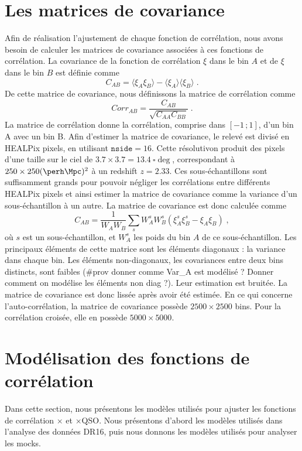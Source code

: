 \documentclass[11pt, twoside, a4paper, openright]{report}
\begin{document}
\section{Les matrices de covariance}
Afin de réalisation l'ajustement de chaque fonction de corrélation, nous avons besoin de calculer les matrices de covariance associées à ces fonctions de corrélation. La covariance de la fonction de corrélation $\xi$ dans le bin $A$ et de $\xi$ dans le bin $B$ est définie comme
\begin{equation}
  C_{AB} = \langle \xi_A \xi_B \rangle - \langle \xi_A \rangle \langle \xi_B \rangle \; .
\end{equation}
De cette matrice de covariance, nous définissons la matrice de corrélation comme
\begin{equation}
  Corr_{AB} = \frac{C_{AB}}{\sqrt{C_{AA} C_{BB}}} \; .
\end{equation}
La matrice de corrélation donne la corrélation, comprise dans $[-1 \, ; 1]$, d'un bin A avec un bin B.
Afin d'estimer la matrice de covariance, le relevé est divisé en HEALPix pixels, en utilisant $\texttt{nside} = \num{16}$. Cette résolutivon produit des pixels d'une taille sur le ciel de $\num{3.7} \times \num{3.7} = \SI{13.4}{\square\deg}$, correspondant à $\num{250} \times \num{250} (\si{\perh\Mpc})^2$ à un redshift $z = \num{2.33}$. Ces sous-échantillons sont suffisamment grands pour pouvoir négliger les corrélations entre différents HEALPix pixels et ainsi estimer la matrice de covariance comme la variance d'un sous-échantillon à un autre. La matrice de covariance est donc calculée comme
\begin{equation}
  C_{AB} = \frac{1}{W_A W_B} \sum_s W_A^s W_B^s \left( \xi_A^s \xi_B^s - \xi_A \xi_B \right) \; ,
\end{equation}
où $s$ est un sous-échantillon, et $W_A^s$ les poids du bin $A$ de ce sous-échantillon.
Les principaux éléments de cette matrice sont les éléments diagonaux : la variance dans chaque bin. Les éléments non-diagonaux, les covariances entre deux bins distincts, sont faibles (\#prov donner comme Var\_A est modélisé ? Donner comment on modélise les éléments non diag ?). Leur estimation est bruitée. La matrice de covariance est donc lissée après avoir été estimée.
En ce qui concerne l'auto-corrélation, la matrice de covariance possède $\num{2500} \times \num{2500}$ bins. Pour la corrélation croisée, elle en possède $\num{5000} \times \num{5000}$.



\section{Modélisation des fonctions de corrélation}
Dans cette section, nous présentons les modèles utilisés pour ajuster les fonctions de corrélation \lya{}$\times$\lya{} et \lya{}$\times$QSO. Nous présentons d'abord les modèles utilisés dans l'analyse des données DR16, puis nous donnons les modèles utilisés pour analyser les mocks.
\end{document}
